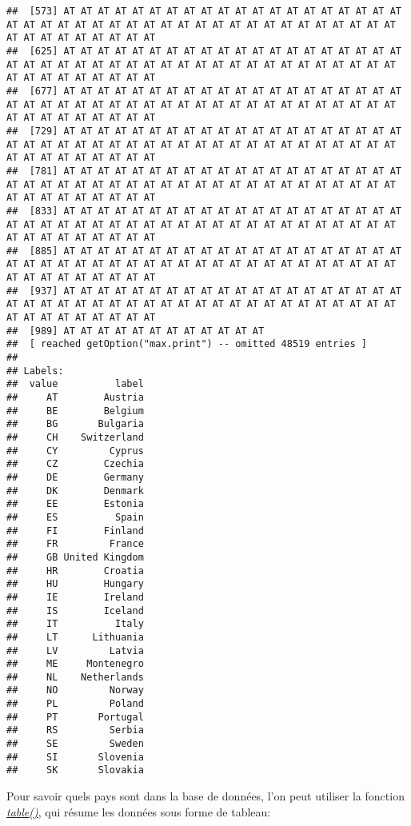 \documentclass[
]{book}
\newenvironment{Shaded}{\begin{snugshade}}{\end{snugshade}}
\newcommand{\FunctionTok}[1]{\textcolor[rgb]{0.00,0.00,0.00}{#1}}
\newcommand{\NormalTok}[1]{#1}
\newcommand{\SpecialCharTok}[1]{\textcolor[rgb]{0.00,0.00,0.00}{#1}}
\begin{document}
\begin{verbatim}
##  [573] AT AT AT AT AT AT AT AT AT AT AT AT AT AT AT AT AT AT AT AT AT AT AT AT AT AT AT AT AT AT AT AT AT AT AT AT AT AT AT AT AT AT AT AT AT AT AT AT AT AT AT AT
##  [625] AT AT AT AT AT AT AT AT AT AT AT AT AT AT AT AT AT AT AT AT AT AT AT AT AT AT AT AT AT AT AT AT AT AT AT AT AT AT AT AT AT AT AT AT AT AT AT AT AT AT AT AT
##  [677] AT AT AT AT AT AT AT AT AT AT AT AT AT AT AT AT AT AT AT AT AT AT AT AT AT AT AT AT AT AT AT AT AT AT AT AT AT AT AT AT AT AT AT AT AT AT AT AT AT AT AT AT
##  [729] AT AT AT AT AT AT AT AT AT AT AT AT AT AT AT AT AT AT AT AT AT AT AT AT AT AT AT AT AT AT AT AT AT AT AT AT AT AT AT AT AT AT AT AT AT AT AT AT AT AT AT AT
##  [781] AT AT AT AT AT AT AT AT AT AT AT AT AT AT AT AT AT AT AT AT AT AT AT AT AT AT AT AT AT AT AT AT AT AT AT AT AT AT AT AT AT AT AT AT AT AT AT AT AT AT AT AT
##  [833] AT AT AT AT AT AT AT AT AT AT AT AT AT AT AT AT AT AT AT AT AT AT AT AT AT AT AT AT AT AT AT AT AT AT AT AT AT AT AT AT AT AT AT AT AT AT AT AT AT AT AT AT
##  [885] AT AT AT AT AT AT AT AT AT AT AT AT AT AT AT AT AT AT AT AT AT AT AT AT AT AT AT AT AT AT AT AT AT AT AT AT AT AT AT AT AT AT AT AT AT AT AT AT AT AT AT AT
##  [937] AT AT AT AT AT AT AT AT AT AT AT AT AT AT AT AT AT AT AT AT AT AT AT AT AT AT AT AT AT AT AT AT AT AT AT AT AT AT AT AT AT AT AT AT AT AT AT AT AT AT AT AT
##  [989] AT AT AT AT AT AT AT AT AT AT AT AT
##  [ reached getOption("max.print") -- omitted 48519 entries ]
## 
## Labels:
##  value          label
##     AT        Austria
##     BE        Belgium
##     BG       Bulgaria
##     CH    Switzerland
##     CY         Cyprus
##     CZ        Czechia
##     DE        Germany
##     DK        Denmark
##     EE        Estonia
##     ES          Spain
##     FI        Finland
##     FR         France
##     GB United Kingdom
##     HR        Croatia
##     HU        Hungary
##     IE        Ireland
##     IS        Iceland
##     IT          Italy
##     LT      Lithuania
##     LV         Latvia
##     ME     Montenegro
##     NL    Netherlands
##     NO         Norway
##     PL         Poland
##     PT       Portugal
##     RS         Serbia
##     SE         Sweden
##     SI       Slovenia
##     SK       Slovakia
\end{verbatim}

Pour savoir quels pays sont dans la base de données, l'on peut utiliser la fonction \href{https://www.rdocumentation.org/packages/base/versions/3.6.2/topics/table}{\emph{table()}}, qui résume les données sous forme de tableau:

\begin{Shaded}
\end{Shaded}
\end{document}
